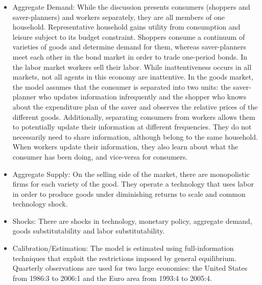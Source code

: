 \documentclass[11pt,a4paper]{article}
\begin{document}
	\begin{itemize}
		\item Aggregate Demand:  While the discussion presents consumers (shoppers and saver-planners) and workers separately, they are all members of one household. Representative household gains utility from consumption and leisure subject to its budget constraint. Shoppers consume a continuum of varieties of goods and determine demand for them, whereas saver-planners meet each other in the bond market in order to trade one-period bonds. In the labor market workers sell their labor. While inattentiveness occurs in all markets, not all agents in this economy are inattentive. In the goods market, the model assumes that the consumer is separated into two units: the saver-planner who updates information infrequently and the shopper who knows about the expenditure plan of the saver and observes the relative prices of the different goods. Additionally, separating consumers from workers allows them to potentially update their information at different frequencies. They do not necessarily need to share information, although belong to the same household. When workers update their information, they also learn about what the consumer has been doing, and vice-versa for consumers.	
		\item Aggregate Supply:  On the selling side of the market, there are monopolistic firms for each variety of the good. They operate a technology that uses labor in order to produce goods under diminishing returns to scale and common technology shock.
		
		\item Shocks: There are shocks in technology, monetary policy, aggregate demand, goods substitutability and labor substitutability.
		
		\item Calibration/Estimation: The model is estimated using full-information techniques that exploit the restrictions imposed by general equilibrium. Quarterly observations are used for two large economies: the United States from 1986:3 to 2006:1 and the Euro area from 1993:4 to 2005:4.
		
		
	\end{itemize}
	
	
	
\end{document}

